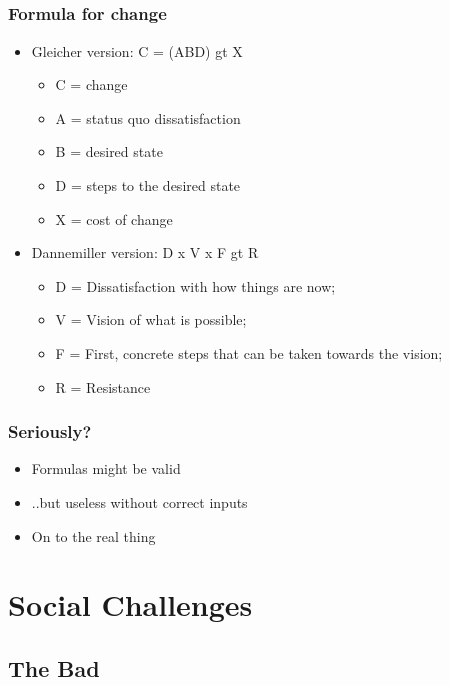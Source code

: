 \documentclass[t]{beamer}
\begin{document}
\subsection{}

\begin{frame}
	\frametitle{Formula for change}
	\begin{itemize}
		\item Gleicher version: C = (ABD) gt X
		\begin{itemize}
			\item C = change
			\item A = status quo dissatisfaction
			\item B = desired state
			\item D = steps to the desired state
			\item X = cost of change
		\end{itemize}
		\item Dannemiller version: D x V x F gt R
		\begin{itemize}
			\item D = Dissatisfaction with how things are now;
			\item V = Vision of what is possible;
			\item F = First, concrete steps that can be taken towards the vision;
			\item R = Resistance
		\end{itemize}
	\end{itemize}
\end{frame}

\begin{frame}
	\frametitle{Seriously?}
	\begin{itemize}
		\item Formulas might be valid
		\item ..but useless without correct inputs
		\item On to the real thing
	\end{itemize}
\end{frame}



\section{Social Challenges}

\subsection{The Bad}
\end{document}

